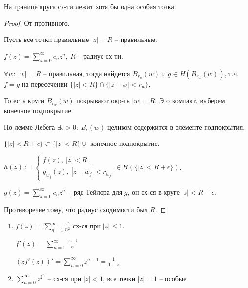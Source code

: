 \begin{theorem}
    На границе круга сх-ти лежит хотя бы одна особая точка.
\end{theorem}
\begin{proof}
    От противного.

    Пусть все точки правильные $|z| = R$ -- правильные.

    $f(z) = \sum_{n=0}^{\infty} { c_n z^n }, \ R$ -- радиус сх-ти.

    $\forall w: \ |w| = R$ -- правильная, тогда найдется $B_{r_w} (w)$ и $g \in H(B_{r_w} (w))$, т.ч. $f = g$ на пересечении $\{ |z| < R \} \cap \{ |z - w| < r_w \}$.

    То есть круги $B_{r_w}(w)$ покрывают окр-ть $|w| = R$. Это компакт, выберем конечное подпокрытие.


    По лемме Лебега $\exists \epsilon > 0: \ B_{\epsilon} (w)$ целиком содержится в элементе подпокрытия.

    $\{ |z| < R + \epsilon \} \subset \{ |z| < R \} \cup$ конечное подпокрытие.

    $h(z) := \begin{cases}
        f(z), \ |z| < R \\
        g_{w_j} (z), \ |z - w_j| < r_{w_j}
    \end{cases} \in H(\{ |z| < R + \epsilon \})$.

    $g(z) = \sum_{n=0}^{\infty} { c_n z^n }$ -- ряд Тейлора для $g$, он сх-ся в круге $|z| < R + \epsilon$.

    Противоречие тому, что радиус сходимости был $R$.
\end{proof}

\begin{example}
    \begin{enumerate}
        \item {
            $f(z) = \sum_{n=1}^{\infty} { \frac{z^n}{n^2} }$ сх-ся при $|z| \leq 1$.

            $f'(z) = \sum_{n=1}^{\infty} { \frac{z^{n-1}}{n} }$

            $(zf'(z))' = \sum_{n=0}^{\infty} { z^{n-1} } = \frac{1}{1-z}$
        }
        \item {
            $\sum_{n=0}^{\infty} { z^{2^n} }$ -- сх-ся при $|z| < 1$, все точки $|z| = 1$ -- особые.
        }
    \end{enumerate}
\end{example}



